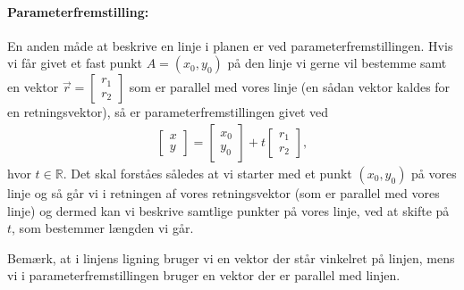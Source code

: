 \paragraph*{Parameterfremstilling:}
En anden måde at beskrive en linje i planen er ved parameterfremstillingen. Hvis vi får givet et fast punkt $A=(x_0,y_0)$ på den linje vi gerne vil bestemme samt en vektor $\vec{r}=\begin{bmatrix}r_1\\r_2 \end{bmatrix}$ som er parallel med vores linje (en sådan vektor kaldes for en retningsvektor), så er parameterfremstillingen givet ved
\begin{align}\label{eq:vec2d2to}
\begin{bmatrix}x \\ y\end{bmatrix} = \begin{bmatrix}x_0 \\y_0\end{bmatrix}  +t
\begin{bmatrix}r_1 \\r_2 \end{bmatrix},
\end{align}
hvor $t \in \mathbb{R}$. Det skal forståes således at vi starter med et punkt $(x_0,y_0)$ på vores linje og så går vi i retningen af vores retningsvektor (som er parallel med vores linje) og dermed kan vi beskrive samtlige punkter på vores linje, ved at skifte på $t$, som bestemmer længden vi går.

Bemærk, at i linjens ligning bruger vi en vektor der står vinkelret på linjen, mens vi i parameterfremstillingen bruger en vektor der er parallel med linjen.

